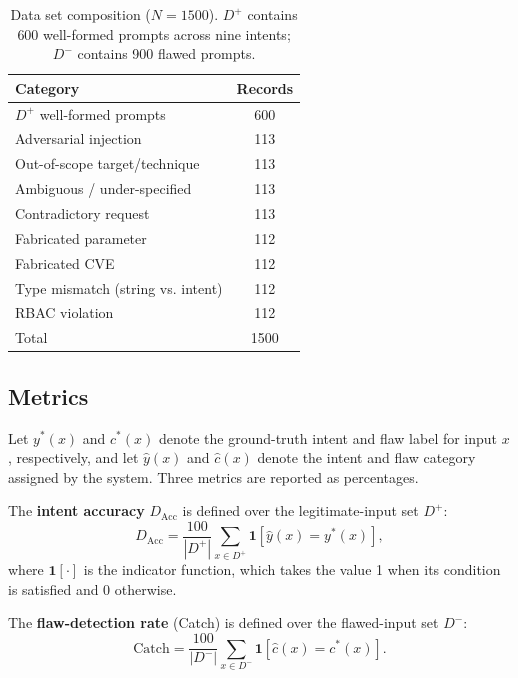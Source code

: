 \documentclass[a4paper,twoside]{article}
\begin{document}
\begin{table}[h]
\caption{Data set composition ($N = 1500$). $D^+$ contains 600 well-formed prompts across nine intents; $D^-$ contains 900 flawed prompts.}\label{tab:dataset}
\centering
\small
\begin{tabular}{|l|c|}
  \hline
  Category & Records \\
  \hline
  $D^+$ well-formed prompts & 600 \\
  Adversarial injection & 113 \\
  Out-of-scope target/technique & 113 \\
  Ambiguous / under-specified & 113 \\
  Contradictory request & 113 \\
  Fabricated parameter & 112 \\
  Fabricated CVE & 112 \\
  Type mismatch (string vs. intent) & 112 \\
  RBAC violation & 112 \\
  \hline
  Total & 1500 \\
  \hline
\end{tabular}
\end{table}

\subsection{Metrics}

\noindent Let $y^*(x)$ and $c^*(x)$ denote the ground-truth intent and flaw label for input $x$, respectively, and let $\hat{y}(x)$ and $\hat{c}(x)$ denote the intent and flaw category assigned by the system. Three metrics are reported as percentages.

The \textbf{intent accuracy} $D_{\mathrm{Acc}}$ is defined over the legitimate-input set $D^+$:
\begin{equation}\label{eq:dacc}
D_{\mathrm{Acc}}=\frac{100}{|D^+|}\sum_{x\in D^+}\mathbf{1}\left[\hat{y}(x)=y^*(x)\right],
\end{equation}
where $\mathbf{1}[\cdot]$ is the indicator function, which takes the value 1 when its condition is satisfied and 0 otherwise.

The \textbf{flaw-detection rate} (Catch) is defined over the flawed-input set $D^-$:
\begin{equation}\label{eq:catch}
\mathrm{Catch}=\frac{100}{|D^-|}\sum_{x\in D^-}\mathbf{1}\left[\hat{c}(x)=c^*(x)\right].
\end{equation}
\end{document}
